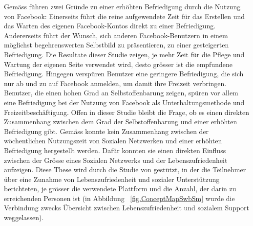 Gemäss  führen zwei Gründe zu einer erhöhten Befriedigung durch die Nutzung von Facebook: Einerseits führt die reine aufgewendete Zeit für das Erstellen und das Warten des eigenen Facebook-Kontos direkt zu einer Befriedigung. Andererseits führt der Wunsch, sich anderen Facebook-Benutzern in einem möglichst begehrenswerten Selbstbild zu präsentieren, zu einer gesteigerten Befriedigung. Die Resultate dieser Studie zeigen, je mehr Zeit für die Pflege und Wartung der eigenen Seite verwendet wird, desto grösser ist die empfundene Befriedigung. Hingegen verspüren Benutzer eine geringere Befriedigung, die sich nur ab und zu auf Facebook anmelden, um damit ihre Freizeit verbringen. \newline
Benutzer, die einen hohen Grad an Selbstoffenbarung zeigen, spüren vor allem eine Befriedigung bei der Nutzung von Facebook als Unterhaltungsmethode und Freizeitbeschäftigung. Offen in dieser Studie bleibt die Frage, ob es einen direkten Zusammenhang zwischen dem Grad der Selbstoffenbarung und einer erhöhten Befriedigung gibt.\newline
Gemäss  konnte kein Zusammenhang zwischen der wöchentlichen Nutzungszeit von Sozialen Netzwerken und einer erhöhten Befriedigung hergestellt werden. Dafür konnten sie einen direkten Einfluss zwischen der Grösse eines Sozialen Netzwerks und der Lebenszufriedenheit aufzeigen. Diese These wird durch die Studie von  gestützt, in der die Teilnehmer über eine Zunahme von Lebenszufriedenheit und sozialer Unterstützung berichteten, je grösser die verwendete Plattform und die Anzahl, der darin zu erreichenden Personen ist (in Abbildung ~\ref{fig.ConceptMapSwbSm} wurde die Verbindung zwecks Übersicht zwischen Lebenszufriedenheit und sozialem Support weggelassen). 

